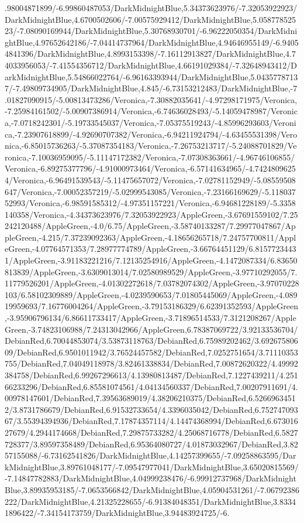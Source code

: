 {\begin{tikzternal}
.98004871899/-6.99860487053/DarkMidnightBlue,5.34373623976/-7.32053922923/DarkMidnightBlue,4.6700502606/-7.00575929412/DarkMidnightBlue,5.05877852523/-7.08090169944/DarkMidnightBlue,5.30768930701/-6.96222050354/DarkMidnightBlue,4.97652642186/-7.04414737964/DarkMidnightBlue,4.94646955149/-6.94054841396/DarkMidnightBlue,4.8993153398/-7.16112913827/DarkMidnightBlue,4.74033956053/-7.41554356712/DarkMidnightBlue,4.66191029384/-7.32648943412/DarkMidnightBlue,5.54866022764/-6.96163393944/DarkMidnightBlue,5.04357787137/-7.49809734905/DarkMidnightBlue,4.845/-6.73153212483/DarkMidnightBlue,-7.01827090915/-5.00813473286/Veronica,-7.30882035641/-4.97298171975/Veronica,-7.25984161502/-5.00907386914/Veronica,-6.74636028493/-5.14059478987/Veronica,-7.0718242301/-5.19733545037/Veronica,-7.05375519243/-4.85996293603/Veronica,-7.23907618899/-4.92690707382/Veronica,-6.94211924794/-4.63455531398/Veronica,-6.85015736263/-5.37087354183/Veronica,-7.26753213717/-5.24088701829/Veronica,-7.10036959095/-5.11147172382/Veronica,-7.07308363661/-4.96746106855/Veronica,-6.89275377796/-4.91000973464/Veronica,-6.57141634965/-4.74248096254/Veronica,-6.96491539543/-5.11475657072/Veronica,-7.02781152949/-5.08559508647/Veronica,-7.00052357219/-5.02999543085/Veronica,-7.23166169629/-5.11803752993/Veronica,-6.98591585312/-4.97351157221/Veronica,-6.94681228189/-5.3358140358/Veronica,-4.34373623976/7.32053922923/AppleGreen,-3.67691559102/7.25242120488/AppleGreen,-4.0/6.75/AppleGreen,-3.58740133287/7.29977047867/AppleGreen,-4.215/7.37239092363/AppleGreen,-4.18656265718/7.24757700811/AppleGreen,-4.07764571353/7.28977774789/AppleGreen,-3.66764451129/6.81577234431/AppleGreen,-3.91183221216/7.12135254916/AppleGreen,-4.1472087334/6.83650813839/AppleGreen,-3.6309013014/7.02580989529/AppleGreen,-3.97710292055/7.11779526201/AppleGreen,-4.01302272618/7.03782074302/AppleGreen,-3.97070228103/6.58102309889/AppleGreen,-4.0239590653/7.01805445069/AppleGreen,-4.08919959693/7.16776004264/AppleGreen,-3.79153186329/6.62391352593/AppleGreen,-3.95906796134/6.86611733417/AppleGreen,-3.71896514533/7.3121208267/AppleGreen,-3.74823106988/7.24313042966/AppleGreen,6.78387069722/3.92133536704/DebianRed,6.70044853074/3.53873118763/DebianRed,6.75989202462/3.69267580609/DebianRed,6.9501011942/3.76524457582/DebianRed,7.0252751654/3.71110353755/DebianRed,7.04049118978/3.82461338834/DebianRed,7.00872620322/4.49992384758/DebianRed,6.99267296613/4.13980813487/DebianRed,7.1227439211/4.25166233296/DebianRed,6.85581074561/4.04134560337/DebianRed,7.00207911691/4.00978147601/DebianRed,7.39563689019/4.38206210375/DebianRed,6.52669634512/3.8731786679/DebianRed,6.91532733654/4.3396035042/DebianRed,6.75274709367/3.55394394936/DebianRed,7.17874357114/4.14474368994/DebianRed,6.67301627679/4.2944174668/DebianRed,7.29875733282/4.25068716778/DebianRed,6.5827728377/3.89597358489/DebianRed,6.95364080727/4.01873032967/DebianRed,3.8257155088/-6.73162541826/DarkMidnightBlue,4.14257399655/-7.09258863595/DarkMidnightBlue,3.89761048177/-7.09547977041/DarkMidnightBlue,3.65020815569/-7.14847782883/DarkMidnightBlue,4.04999238476/-6.99912737968/DarkMidnightBlue,3.89935953185/-7.0653566842/DarkMidnightBlue,4.05904531261/-7.06792386222/DarkMidnightBlue,4.21325228655/-6.91384048351/DarkMidnightBlue,3.83341896422/-7.34154173759/DarkMidnightBlue,3.94483924725/-6.
\end{tikzternal}}
